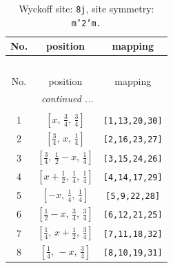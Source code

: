 \documentclass[fleqn,8pt]{jsarticle}
\begin{document}
\begin{longtable}{ccc}
\caption{Wyckoff site: {\tt 8j}, site symmetry: {\tt m'2'm.}}
 \\
 \hline \hline
No. & position & mapping \\ \hline \endfirsthead

\multicolumn{2}{l}{\tablename\ \thetable{}} \\
 \hline \hline
No. & position & mapping \\ \hline \endhead

 \hline \hline
\multicolumn{2}{r}{\footnotesize\it continued ...} \\ \endfoot

 \hline \hline
\multicolumn{2}{r}{} \\ \endlastfoot

1 & $\left[ x,\, \frac{3}{4},\, \frac{3}{4} \right]$ & {\tt [1,13,20,30]} \\ \hline
2 & $\left[ \frac{3}{4},\, x,\, \frac{1}{4} \right]$ & {\tt [2,16,23,27]} \\ \hline
3 & $\left[ \frac{3}{4},\, \frac{1}{2} - x,\, \frac{1}{4} \right]$ & {\tt [3,15,24,26]} \\ \hline
4 & $\left[ x + \frac{1}{2},\, \frac{1}{4},\, \frac{1}{4} \right]$ & {\tt [4,14,17,29]} \\ \hline
5 & $\left[ - x,\, \frac{1}{4},\, \frac{1}{4} \right]$ & {\tt [5,9,22,28]} \\ \hline
6 & $\left[ \frac{1}{2} - x,\, \frac{3}{4},\, \frac{3}{4} \right]$ & {\tt [6,12,21,25]} \\ \hline
7 & $\left[ \frac{1}{4},\, x + \frac{1}{2},\, \frac{3}{4} \right]$ & {\tt [7,11,18,32]} \\ \hline
8 & $\left[ \frac{1}{4},\, - x,\, \frac{3}{4} \right]$ & {\tt [8,10,19,31]} \\
\end{longtable}
\renewcommand{\arraystretch}{1.2}
\end{document}
